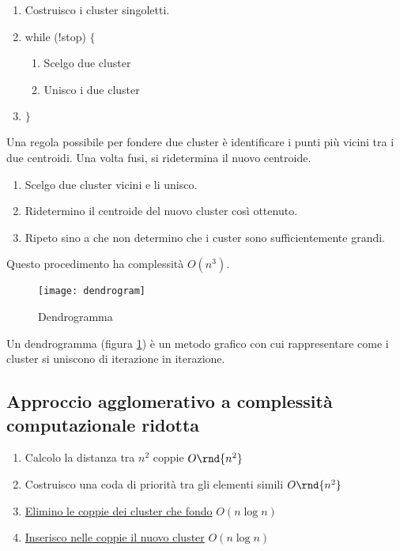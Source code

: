 \documentclass[\main/main.tex]{subfiles}
\begin{document}
\begin{enumerate}
  \item Costruisco i cluster singoletti.
  \item while (!stop) $\{$
        \begin{enumerate}
          \item Scelgo due cluster
          \item Unisco i due cluster
        \end{enumerate}
  \item $\}$
\end{enumerate}

Una regola possibile per fondere due cluster è identificare i punti più vicini tra i due centroidi. Una volta fusi, si ridetermina il nuovo centroide.

\begin{enumerate}
  \item Scelgo due cluster vicini e li unisco.
  \item Ridetermino il centroide del nuovo cluster così ottenuto.
  \item Ripeto sino a che non determino che i custer sono sufficientemente grandi.
\end{enumerate}

Questo procedimento ha complessità $O(n^3)$.

\begin{figure}
  \texttt{[image: dendrogram]}
  \caption{Dendrogramma}
  \label{fig:dendrogram}
\end{figure}

\begin{definition}[Dendrogramma]
  Un dendrogramma (figura \ref{fig:dendrogram}) è un metodo grafico con cui rappresentare come i cluster si uniscono di iterazione in iterazione.
\end{definition}

\subsection{Approccio agglomerativo a complessità computazionale ridotta}

\begin{enumerate}
  \item Calcolo la distanza tra $n^2$ coppie \dotfill \textbf{$O\rnd{n^2}$}
  \item Costruisco una coda di priorità tra gli elementi simili \dotfill \textbf{$O\rnd{n^2}$}
  \item \underline{Elimino le coppie dei cluster che fondo} \dotfill \textbf{$O(n\log n)$}
  \item \underline{Inserisco nelle coppie il nuovo cluster} \dotfill \textbf{$O(n\log n)$}
\end{enumerate}
\end{document}
